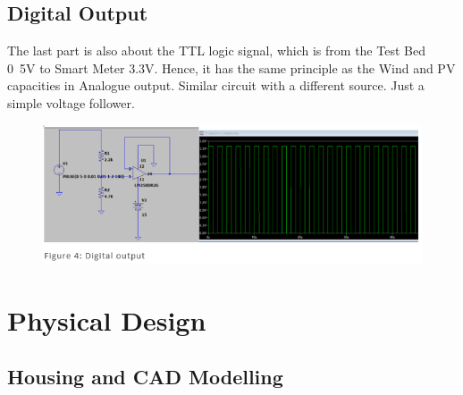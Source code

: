 \documentclass[9pt, technote, a4paper, nofonttune]{IEEEphot}
\begin{document}
         \subsection{Digital Output}
         \hspace{0.5cm} The last part is also about the TTL logic signal, which is from the 
         Test Bed 0~5V to Smart Meter 3.3V. Hence, it has the same principle as the Wind and 
         PV capacities in Analogue output. Similar circuit with a different source. Just a 
         simple voltage follower.
        \begin{figure}[h]
        \centering
        \includegraphics[width=30pc]{D5/5 digital.png}
        \label{fig_env1}
        \end{figure}

\newpage
\section{Physical Design}

        \subsection{Housing and CAD Modelling}
\end{document}
